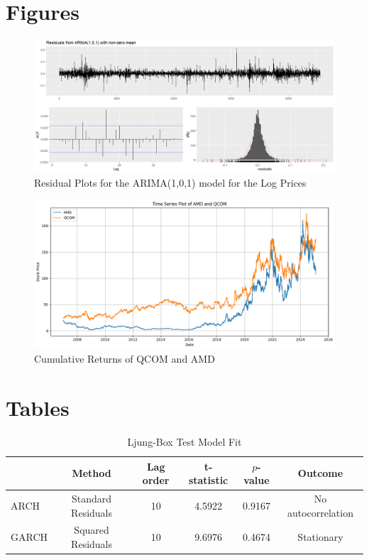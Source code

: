 \begin{appendices}
	\chapter{Figures}
	\begin{figure}[h]
		\centering
		\includegraphics[width=0.7\linewidth]{content/plots/residual_plot_1_1.png}
		\caption{Residual Plots for the ARIMA(1,0,1) model for the Log Prices}
		\label{fig:residual_plot_1_1}
	\end{figure}
	
	\begin{figure}[!h]
		\centering
		\includegraphics[width=0.8\linewidth]{content/plots/QCOM_AMD.png}
		\caption{Cumulative Returns of QCOM and AMD}
		\label{fig:amd_qcom_cumul_returns}
	\end{figure}
	
	\chapter{Tables}
	
	\begin{table}[ht]
		\centering
		\caption{Ljung-Box Test Model Fit}
		\begin{tabular}[t]{lccccc}
			\toprule
			   & Method &Lag order& t-statistic & $p$-value & Outcome  \\
			\midrule
			ARCH & Standard Residuals & 10 & 4.5922 & 0.9167 & No autocorrelation  \\				
			GARCH & Squared Residuals & 10& 9.6976 & 0.4674 & Stationary  \\				
			\bottomrule
		\end{tabular}\label{tab:ARCH_GARCH}
	\end{table}

\end{appendices}